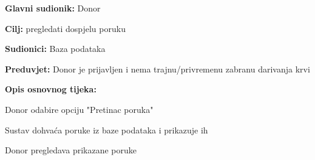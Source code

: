 \noindent {}
					\begin{packed_item}
	
						\item \textbf{Glavni sudionik: }Donor
						\item \textbf{Cilj:} pregledati dospjelu poruku
						\item \textbf{Sudionici:} Baza podataka
						\item \textbf{Preduvjet:} Donor je prijavljen i nema trajnu/privremenu zabranu darivanja krvi
						\item \textbf{Opis osnovnog tijeka:}
						
						\item[] \begin{packed_enum}
	
							\item Donor odabire opciju "Pretinac poruka"
							\item Sustav dohvaća poruke iz baze podataka i prikazuje ih
							\item Donor pregledava prikazane poruke
							
						\end{packed_enum}

					\end{packed_item}


